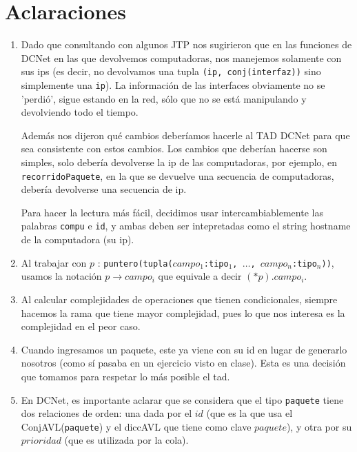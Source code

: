 \documentclass[a4paper,10pt, nofootinbib]{article}
\begin{document}
\maketitle
\thispagestyle{empty}

\section{Aclaraciones}
\begin{enumerate}
  \item Dado que consultando con algunos JTP nos sugirieron que en las funciones de DCNet en las que devolvemos computadoras, nos manejemos solamente con sus ips (es decir, no devolvamos una tupla \texttt{(ip, conj(interfaz))} sino simplemente una \texttt{ip}). La información de las interfaces obviamente no se 'perdió', sigue estando en la red, sólo que no se está manipulando y devolviendo todo el tiempo.
   
    Además nos dijeron qué cambios deberíamos hacerle al TAD DCNet para que sea consistente con estos cambios. Los cambios que deberían hacerse son simples, solo debería devolverse la ip de las computadoras, por ejemplo, en \texttt{recorridoPaquete}, en la que se devuelve una secuencia de computadoras, debería devolverse una secuencia de ip.
    
    Para hacer la lectura más fácil, decidimos usar intercambiablemente las palabras \texttt{compu} e \texttt{id}, y ambas deben ser intepretadas como el string hostname de la computadora (su ip).
    
    \item Al trabajar con $p$ : \texttt{puntero(tupla($campo_1$:tipo$_1$, $\dots$, $campo_n$:tipo$_n$))}, usamos la notación $p\to campo_i$ que equivale a decir $(*p).campo_i$. 
    \item Al calcular complejidades de operaciones que tienen condicionales, siempre hacemos la rama que tiene mayor complejidad, pues lo que nos interesa es la complejidad en el peor caso. 
	\item Cuando ingresamos un paquete, este ya viene con su id en lugar de generarlo nosotros (como sí pasaba en un ejercicio visto en clase). Esta es una decisión que tomamos para respetar lo más posible el tad. 
	\item En DCNet, es importante aclarar que se considera que el tipo \texttt{paquete} tiene dos relaciones de orden: una dada por el $id$ (que es la que usa el ConjAVL(\texttt{paquete}) y el diccAVL que tiene como clave $paquete$), y otra por su $prioridad$ (que es utilizada por la cola).

\end{enumerate}
\end{document}

